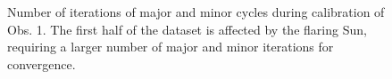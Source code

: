 \documentclass{aa}
\begin{document}
\begin{figure}[tbh]

\caption{\label{fig:Major-and-minor}Number of iterations of major and minor
cycles during calibration of Obs. 1. The first
half of the dataset is affected by the flaring Sun, requiring
a larger number of major and minor iterations for convergence.}
\end{figure}
\end{document}
